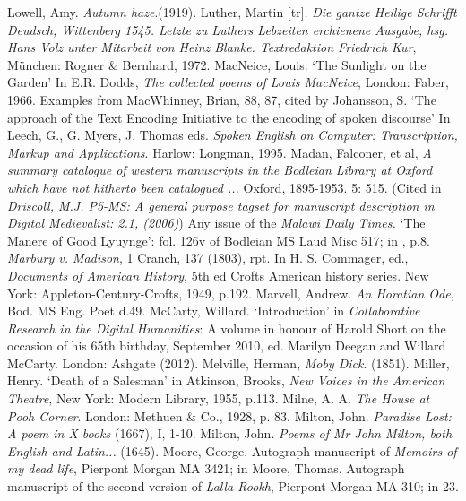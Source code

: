 \begin{bibitemlist}{1}
 Lowell, Amy. \textit{Autumn haze}.(1919).
 Luther, Martin [tr]. \textit{Die gantze Heilige Schrifft Deudsch, Wittenberg 1545. Letzte zu Luthers Lebzeiten erchienene Ausgabe, hsg. Hans Volz unter Mitarbeit von Heinz Blanke. Textredaktion Friedrich Kur}, München: Rogner \& Bernhard, 1972.
 MacNeice, Louis. ‘The Sunlight on the Garden’ In E.R. Dodds,  \textit{The collected poems of Louis MacNeice}, London: Faber, 1966.
 Examples from MacWhinney, Brian, 88, 87, cited by Johansson, S.  ‘The approach of the Text Encoding Initiative to the encoding of spoken discourse’ In Leech, G., G. Myers, J. Thomas eds. \textit{Spoken English on Computer: Transcription, Markup and Applications}. Harlow: Longman, 1995.
 Madan, Falconer, et al, \textit{A summary catalogue of western manuscripts in the Bodleian Library at Oxford which have not hitherto been catalogued ...} Oxford, 1895-1953. 5: 515.  (Cited in \textit{Driscoll, M.J. P5-MS: A general purpose tagset for manuscript description in Digital Medievalist: 2.1, (2006)})
 Any issue of the \textit{Malawi Daily Times.}
 ‘The Manere of Good Lyuynge’: fol. 126v of Bodleian MS Laud Misc 517; in \cite{PARKES}, p.8.
 \textit{Marbury v. Madison}, 1 Cranch, 137  (1803), rpt. In H. S. Commager, ed., \textit{Documents of American History}, 5th ed Crofts American history series. New York: Appleton-Century-Crofts, 1949, p.192.
 Marvell, Andrew. \textit{An Horatian Ode}, Bod. MS Eng. Poet d.49.
 McCarty, Willard. ‘Introduction’ in \textit{Collaborative Research in the Digital Humanities}: A volume in honour of Harold Short on the occasion of his 65th birthday, September 2010, ed. Marilyn Deegan and Willard McCarty. London: Ashgate (2012).
 Melville, Herman, \textit{Moby Dick}. (1851).
 Miller, Henry. ‘Death of a Salesman’ in Atkinson, Brooks,  \textit{New Voices in the American Theatre}, New York: Modern Library, 1955, p.113.
 Milne, A. A.  \textit{The House at Pooh Corner}. London: Methuen \& Co., 1928, p. 83.
 Milton, John. \textit{Paradise Lost: A poem in X books} (1667), I, 1-10.
 Milton, John. \textit{Poems of Mr John Milton, both English and Latin...} (1645).
 Moore, George. Autograph manuscript of \textit{Memoirs of my dead life}, Pierpont Morgan MA 3421; in \cite{KLINKENBORG}
 Moore, Thomas. Autograph manuscript of the second version of \textit{Lalla Rookh}, Pierpont Morgan MA 310; in \cite{KLINKENBORG} 23.

\end{bibitemlist}
